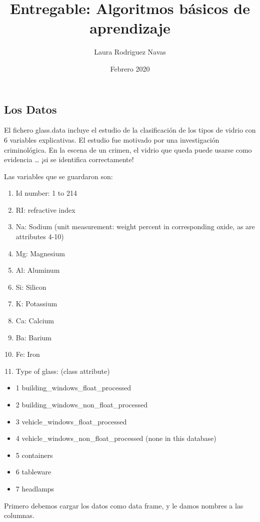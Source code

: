 \documentclass[]{article}
\title{Entregable: Algoritmos básicos de aprendizaje}
\author{Laura Rodriguez Navas}
\date{Febrero 2020}
\providecommand{\tightlist}{%
  \setlength{\itemsep}{0pt}\setlength{\parskip}{0pt}}
\begin{document}
\maketitle

\hypertarget{los-datos}{%
\subsection{Los Datos}\label{los-datos}}

El fichero glass.data incluye el estudio de la clasificación de los
tipos de vidrio con 6 variables explicativas. El estudio fue motivado
por una investigación criminológica. En la escena de un crimen, el
vidrio que queda puede usarse como evidencia \ldots{} ¡si se identifica
correctamente!

Las variables que se guardaron son:

\begin{enumerate}
\def\labelenumi{\arabic{enumi}.}
\tightlist
\item
  Id number: 1 to 214
\item
  RI: refractive index
\item
  Na: Sodium (unit measurement: weight percent in corresponding oxide,
  as are attributes 4-10)
\item
  Mg: Magnesium
\item
  Al: Aluminum
\item
  Si: Silicon
\item
  K: Potassium
\item
  Ca: Calcium
\item
  Ba: Barium
\item
  Fe: Iron
\item
  Type of glass: (class attribute)
\end{enumerate}

\begin{itemize}
\tightlist
\item
  1 building\_windows\_float\_processed
\item
  2 building\_windows\_non\_float\_processed
\item
  3 vehicle\_windows\_float\_processed
\item
  4 vehicle\_windows\_non\_float\_processed (none in this database)
\item
  5 containers
\item
  6 tableware
\item
  7 headlamps
\end{itemize}

Primero debemos cargar los datos como data frame, y le damos nombres a
las columnas.
\end{document}
